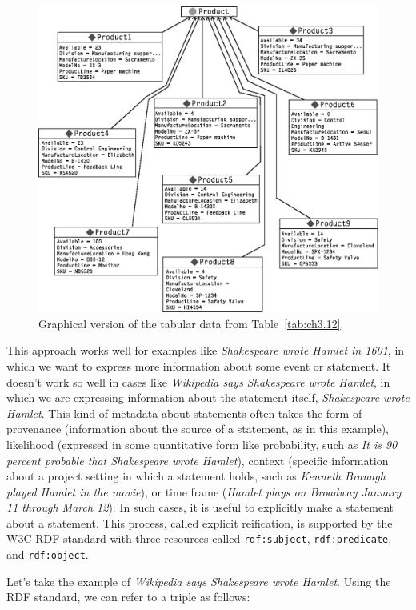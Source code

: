 \begin{figure}
    \centering
    \includegraphics[width=5.0in]{media/f03-07-9780123859655.eps}
    \caption{Graphical version of the tabular data from Table~\ref{tab:ch3.12}.}
    \label{fig:ch3.7}
\end{figure}


This approach works well for examples like \emph{Shakespeare wrote
Hamlet in 1601}, in which we want to express more information about some
event or statement. It doesn't work so well in cases like
\emph{Wikipedia says Shakespeare wrote Hamlet}, in which we are
expressing information about the statement itself, \emph{Shakespeare
wrote Hamlet}. This kind of metadata about statements often takes the
form of provenance (information about the source of a statement, as in
this example), likelihood (expressed in some quantitative form like
probability, such as \emph{It is 90 percent probable that Shakespeare
wrote Hamlet}), context (specific information about a project setting in
which a statement holds, such as \emph{Kenneth Branagh played Hamlet in
the movie}), or time frame (\emph{Hamlet plays on Broadway January 11
through March 12}). In such cases, it is useful to explicitly make a
statement about a statement. This process, called explicit reification,
is supported by the W3C RDF standard with three resources called
\texttt{rdf:subject}, \texttt{rdf:predicate}, and \texttt{rdf:object}.

Let's take the example of \emph{Wikipedia says Shakespeare wrote
Hamlet}. Using the RDF standard, we can refer to a triple as follows:


